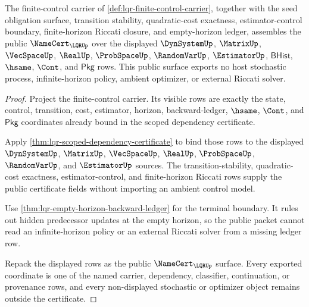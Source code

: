 \begin{theorem}
\label{thm:lqr-public-namecert-export}
The finite-control carrier of \autoref{def:lqr-finite-control-carrier}, together with the seed obligation surface, transition stability, quadratic-cost exactness, estimator-control boundary, finite-horizon Riccati closure, and empty-horizon ledger, assembles the public $\NameCert_{\LQRUp}$ over the displayed $\DynSystemUp$, $\MatrixUp$, $\VecSpaceUp$, $\RealUp$, $\ProbSpaceUp$, $\RandomVarUp$, $\EstimatorUp$, $\mathsf{BHist}$, $\hsame$, $\Cont$, and $\mathsf{Pkg}$ rows. This public surface exports no host stochastic process, infinite-horizon policy, ambient optimizer, or external Riccati solver.
\end{theorem}
\begin{proof}
Project the finite-control carrier. Its visible rows are exactly the state, control, transition, cost, estimator, horizon, backward-ledger, $\hsame$, $\Cont$, and $\mathsf{Pkg}$ coordinates already bound in the scoped dependency certificate.

Apply \autoref{thm:lqr-scoped-dependency-certificate} to bind those rows to the displayed $\DynSystemUp$, $\MatrixUp$, $\VecSpaceUp$, $\RealUp$, $\ProbSpaceUp$, $\RandomVarUp$, and $\EstimatorUp$ sources. The transition-stability, quadratic-cost exactness, estimator-control, and finite-horizon Riccati rows supply the public certificate fields without importing an ambient control model.

Use \autoref{thm:lqr-empty-horizon-backward-ledger} for the terminal boundary. It rules out hidden predecessor updates at the empty horizon, so the public packet cannot read an infinite-horizon policy or an external Riccati solver from a missing ledger row.

Repack the displayed rows as the public $\NameCert_{\LQRUp}$ surface. Every exported coordinate is one of the named carrier, dependency, classifier, continuation, or provenance rows, and every non-displayed stochastic or optimizer object remains outside the certificate.
\end{proof}

